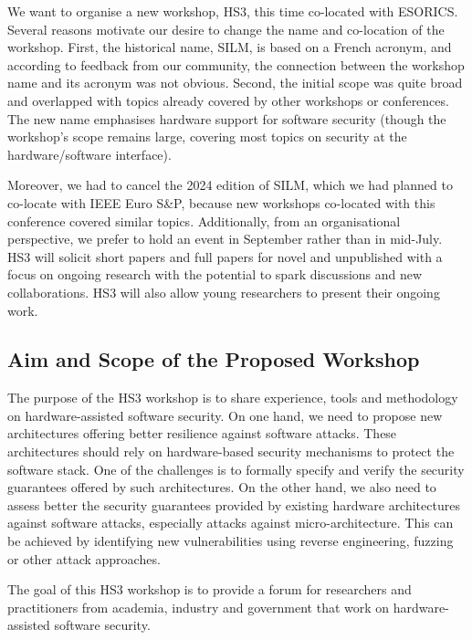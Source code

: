 \documentclass[a4paper,11pt]{article}
\newcommand{\SILMYear}{2025}
\begin{document}
We want to organise a new workshop, HS3, this time co-located with ESORICS. Several reasons motivate our desire to change the name and co-location of the workshop. First, the historical name, SILM, is based on a French acronym, and according to feedback from our community, the connection between the workshop name and its acronym was not obvious. Second, the initial scope was quite broad and overlapped with topics already covered by other workshops or conferences. The new name emphasises hardware support for software security (though the workshop’s scope remains large, covering most topics on security at the hardware/software interface).

Moreover, we had to cancel the 2024 edition of SILM, which we had planned to co-locate with IEEE Euro S\&P, because new workshops co-located with this conference covered similar topics. Additionally, from an organisational perspective, we prefer to hold an event in September rather than in mid-July.
HS3 will solicit short papers and full papers for novel and unpublished with a focus on ongoing research with the potential to spark
discussions and new collaborations. HS3 will also allow
young researchers to present their ongoing work.

\subsection{Aim and Scope of the Proposed Workshop}
%
The purpose of the HS3 workshop is to share experience, tools and
methodology on hardware-assisted software security. On one
hand, we need to propose new architectures offering better
resilience against software attacks. These architectures should rely on
hardware-based security mechanisms to protect the software stack. One of
the challenges is to formally specify and verify the security guarantees
offered by such architectures. On the other hand, we also need to assess better the security guarantees provided by existing
hardware architectures against software attacks, especially attacks against
micro-architecture. This can be achieved by identifying new vulnerabilities
using reverse engineering, fuzzing or other attack approaches. 

The goal of this HS3 workshop is to provide a forum
for  researchers and practitioners from academia, industry and government
that work on hardware-assisted software security.

\end{document}
